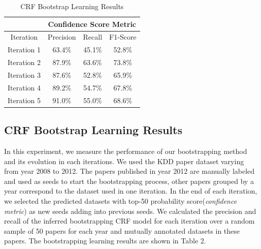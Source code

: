 \documentclass[10pt]{article}
\begin{document}
\begin{table}
\centering
\hspace{-1cm}
\scriptsize
\vspace{0pt}
\begin{tabular}{|c @{\hskip 0.02in}| c | c | c |} %
	\hline %
	  & \multicolumn{3}{c|}{Confidence Score Metric} \\
	\hline %
	 Iteration & Precision & Recall & F1-Score  \\ [0.2ex] %
	\hline \hline
	Iteration 1 & 63.4\% & 45.1\%  & 52.8\%  \\
	\hline
	 Iteration 2 & 87.9\% & 63.6\% & 73.8\%  \\
	\hline
	Iteration 3 & 87.6\% &  52.8\% & 65.9\%  \\
	\hline
	Iteration 4 & 89.2\% & 54.7\% & 67.8\%  \\
	\hline
	Iteration 5 & 91.0\% & 55.0\% & 68.6\%  \\
	\hline
	\end{tabular} 
	\caption{CRF Bootstrap Learning Results}
	\label{table:bootstrap} %
\end{table} 

\subsection{CRF Bootstrap Learning Results}
In this experiment, we measure the performance of our bootstrapping method and its evolution in each iterations. We used the KDD paper dataset varying from year 2008 to 2012. The papers published in year 2012 are manually labeled and used as seeds to start the bootstrapping process, other papers grouped by a year correspond to the dataset used in one iteration. In the end of each iteration, we selected the predicted datasets with top-50 probability score(\emph{confidence metric}) as new seeds adding into previous seeds. We calculated the precision and recall of the inferred bootstrapping CRF model for each iteration over a random sample of 50 papers for each year and mutually annotated datasets in these papers. The bootstrapping learning results are shown in Table 2. 
\end{document}
